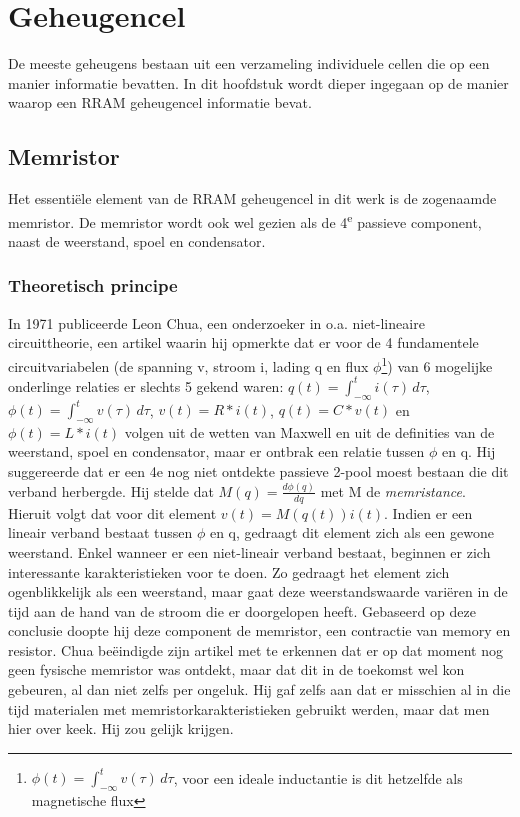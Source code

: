 \chapter{Geheugencel}
\label{cell}
De meeste geheugens bestaan uit een verzameling individuele cellen die op een manier informatie bevatten.
In dit hoofdstuk wordt dieper ingegaan op de manier waarop een RRAM geheugencel informatie bevat.

\section{Memristor}
Het essentiële element van de RRAM geheugencel in dit werk is de zogenaamde memristor.
De memristor wordt ook wel gezien als de 4\textsuperscript{e} passieve component, naast de weerstand, spoel en condensator.

\subsection{Theoretisch principe}
In 1971 publiceerde Leon Chua, een onderzoeker in o.a. niet-lineaire circuittheorie, een artikel waarin hij opmerkte dat er voor de 4 fundamentele circuitvariabelen (de spanning v, stroom i, lading q en flux $\phi$\footnote{$\phi(t) =  \int^{t}_{-\infty} v(\tau) \, d\tau $, voor een ideale inductantie is dit hetzelfde als magnetische flux}) van 6 mogelijke onderlinge relaties er slechts 5 gekend waren: $q(t) =  \int^{t}_{-\infty} i(\tau) \, d\tau $, $\phi(t) =  \int^{t}_{-\infty} v(\tau) \, d\tau $, $v(t)=R*i(t)$, $q(t)=C*v(t)$ en $\phi(t) = L*i(t)$ volgen uit de wetten van Maxwell en uit de definities van de weerstand, spoel en condensator, maar er ontbrak een relatie tussen $\phi$ en q\cite{Chu71}. Hij suggereerde dat er een 4e nog niet ontdekte passieve 2-pool moest bestaan die dit verband herbergde. Hij stelde dat $M(q)= \frac{d\phi(q)}{dq}$ met M de \emph{memristance}.
Hieruit volgt dat voor dit element $v(t)=M(q(t)) i(t)$. Indien er een lineair verband bestaat tussen $\phi$ en q, gedraagt dit element zich als een gewone weerstand. Enkel wanneer er een niet-lineair verband bestaat, beginnen er zich interessante karakteristieken voor te doen. Zo gedraagt het element zich ogenblikkelijk als een weerstand, maar gaat deze weerstandswaarde variëren in de tijd aan de hand van de stroom die er doorgelopen heeft.
Gebaseerd op deze conclusie doopte hij deze component de memristor, een contractie van memory en resistor.
Chua beëindigde zijn artikel met te erkennen dat er op dat moment nog geen fysische memristor was ontdekt, maar dat dit in de toekomst wel kon gebeuren, al dan niet zelfs per ongeluk. Hij gaf zelfs aan dat er misschien al in die tijd materialen met memristorkarakteristieken gebruikt werden, maar dat men hier over keek. Hij zou gelijk krijgen.

